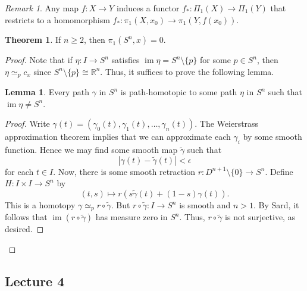 \documentclass[10pt,letterpaper,cm]{nupset}
\theoremstyle{definition}
\theoremstyle{theorem}
\newtheorem{theorem}[definition]{Theorem}
\newtheorem{lemma}[definition]{Lemma}
\theoremstyle{remark}
\newtheorem{remark}[definition]{Remark}
\newcommand{\R}{\mathbb{R}}
\newcommand{\1}{\mathbb{1}}
\newcommand{\0}{\vec 0}
\DeclareMathOperator{\im}{im}
\begin{document}
\begin{remark}
Any map $f: X \to Y$ induces a functor $f_{\ast} : \Pi_1(X) \to \Pi_1(Y)$ that restricts to a homomorphism $f_{\ast} : \pi_1(X, x_0) \to \pi_1(Y, f(x_0))$.
\end{remark}

\begin{theorem}
If $n\geq 2$, then $\pi_1(S^n, x) =0$.
\end{theorem}
\begin{proof}
Note that if $\eta : I \to S^n$ satisfies $\im{\eta} = S^n \setminus \{p\}$ for some $p\in S^n$, then $\eta \simeq_p c_x$ since $S^n \setminus \{p\} \cong \R^n$. Thus, it suffices to prove the following lemma.
\begin{lemma}
Every path $\gamma$ in $S^n$ is path-homotopic to some path $\eta$ in $S^n$ such that $\im{\eta} \ne S^n$.
\end{lemma}
\begin{proof}
Write $\gamma(t) = (\gamma_0(t), \gamma_1(t), \ldots, \gamma_n(t))$. The Weierstrass approximation theorem implies that we can approximate each $\gamma_i$ by some smooth function. Hence we may find some smooth map $\tilde{\gamma}$ such that $$|\gamma(t) - \tilde{\gamma}(t)| <\epsilon$$ for each $t\in I$. Now, there is some smooth retraction $r: D^{n+1}\setminus \{0\} \to S^n$. Define $H : I \times I \to S^n$ by $$(t, s) \mapsto r(s\tilde{\gamma}(t) + (1-s)\gamma(t)).$$ This is a homotopy $\gamma \simeq_p r\circ \tilde{\gamma}$. But $r\circ \tilde{\gamma} : I \to S^n$ is smooth and $n>1$. By Sard, it follows that $\im(r\circ \tilde{\gamma})$ has measure zero in $S^n$. Thus, $r\circ \tilde{\gamma}$ is not surjective, as desired. 
\end{proof}
\end{proof}

\subsection{Lecture 4}
\end{document}
